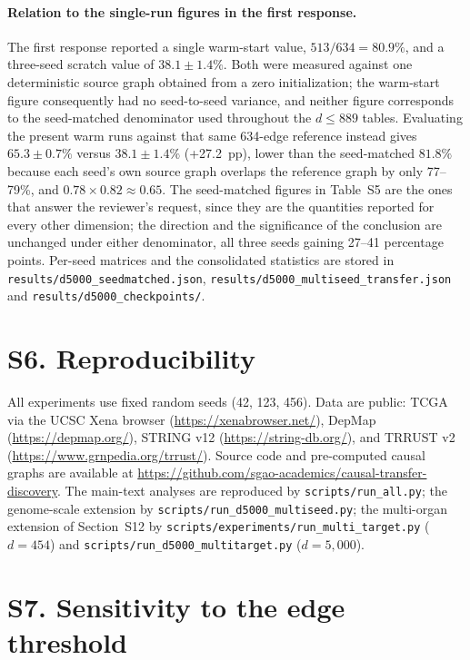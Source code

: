 \documentclass[11pt]{article}
\begin{document}
\paragraph{Relation to the single-run figures in the first response.} The first response
reported a single warm-start value, $513/634=80.9\%$, and a three-seed scratch value of
$38.1\pm1.4\%$. Both were measured against one deterministic source graph obtained from a
zero initialization; the warm-start figure consequently had no seed-to-seed variance, and
neither figure corresponds to the seed-matched denominator used throughout the
$d\le889$ tables. Evaluating the present warm runs against that same 634-edge reference
instead gives $65.3\pm0.7\%$ versus $38.1\pm1.4\%$ (+27.2~pp), lower than the seed-matched
$81.8\%$ because each seed's own source graph overlaps the reference graph by only
77--79\%, and $0.78\times0.82\approx0.65$. The seed-matched figures in Table~S5 are the
ones that answer the reviewer's request, since they are the quantities reported for every
other dimension; the direction and the significance of the conclusion are unchanged under
either denominator, all three seeds gaining 27--41 percentage points. Per-seed matrices
and the consolidated statistics are stored in \texttt{results/d5000\_seedmatched.json},
\texttt{results/d5000\_multiseed\_transfer.json} and
\texttt{results/d5000\_checkpoints/}.

\section*{S6. Reproducibility}

All experiments use fixed random seeds (42, 123, 456). Data are public: TCGA via the
UCSC Xena browser (\url{https://xenabrowser.net/}), DepMap
(\url{https://depmap.org/}), STRING v12 (\url{https://string-db.org/}), and TRRUST v2
(\url{https://www.grnpedia.org/trrust/}). Source code and pre-computed causal graphs are
available at \url{https://github.com/sgao-academics/causal-transfer-discovery}.
The main-text analyses are reproduced by \texttt{scripts/run\_all.py}; the genome-scale
extension by \texttt{scripts/run\_d5000\_multiseed.py}; the multi-organ extension of
Section~S12 by \texttt{scripts/experiments/run\_multi\_target.py} ($d=454$) and
\texttt{scripts/run\_d5000\_multitarget.py} ($d=5{,}000$).

\section*{S7. Sensitivity to the edge threshold}
\end{document}
